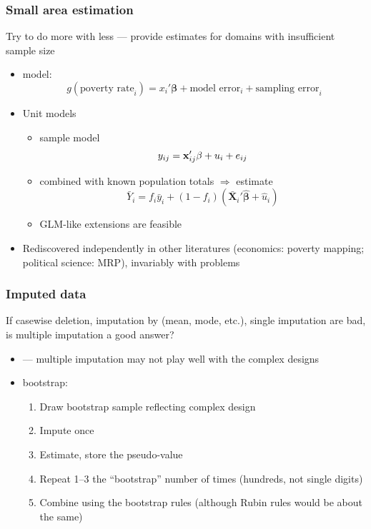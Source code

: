 \documentclass{beamer}
\begin{document}
\begin{frame}\frametitle{Small area estimation}

Try to do more with less --- provide estimates for domains with insufficient sample size

\begin{itemize}
    \item \citet{fay:herriot:1979} model:
        $$
            g(\mbox{poverty rate}_i) = x_i'\mathbf{\beta} + \mbox{model error}_i + \mbox{sampling error}_i
        $$
    \item Unit models \citep{rao:molina:2015}
    \begin{itemize}
        \item sample model
            $$
                y_{ij} = {\bf x}_{ij}' \mathbf{\beta} + u_i + e_{ij}
            $$
        \item combined with known population totals $\Rightarrow$ estimate
            $$
                \bar Y_i = f_i \bar y_i + (1-f_i) (\bar {\mathbf X}_i ' \hat{\mathbf{\beta}} + \hat u_i)
            $$
        \item GLM-like extensions are feasible
    \end{itemize}
    \item Rediscovered independently in other literatures (economics: poverty mapping; political science: MRP),
        invariably with problems \citep{molina:rao:2010}
\end{itemize}

\end{frame}

\begin{frame}\frametitle{Imputed data}

If casewise deletion, imputation by (mean, mode, etc.), single imputation
are bad, is multiple imputation \citep{rubin:1996} a good answer?

\begin{itemize}
    \item \citet{kim:brick:fuller:kalton:2006} --- multiple imputation may not play well with the complex designs
    \item \citet{shao:sitter:1996} bootstrap:
        \begin{enumerate}
            \item Draw bootstrap sample reflecting complex design
            \item Impute once
            \item Estimate, store the pseudo-value
            \item Repeat 1--3 the ``bootstrap'' number of times (hundreds, not single digits)
            \item Combine using the bootstrap rules (although Rubin rules would be about the same)
        \end{enumerate}
\end{itemize}

\end{frame}
\end{document}
